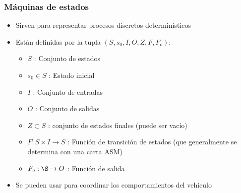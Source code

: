 \begin{frame}\frametitle{Máquinas de estados}
  \begin{itemize}
  \item Sirven para representar procesos discretos determinísticos
  \item Están definidas por la tupla $(S, s_0, I, O, Z, F, F_o)$:
    \begin{itemize}
    \item $S$ : Conjunto de estados
    \item $s_0 \in S$ : Estado inicial
    \item $I$ : Conjunto de entradas
    \item $O$ : Conjunto de salidas
    \item $Z \subset S$ : conjunto de estados finales (puede ser vacío)
    \item $F : S\times I \rightarrow S$ : Función de transición de estados (que generalmente se determina con una carta ASM)
    \item $F_o : \S \rightarrow O$ : Función de salida 
    \end{itemize}
  \item Se pueden usar para coordinar los comportamientos del vehículo 
  \end{itemize}
\end{frame}

